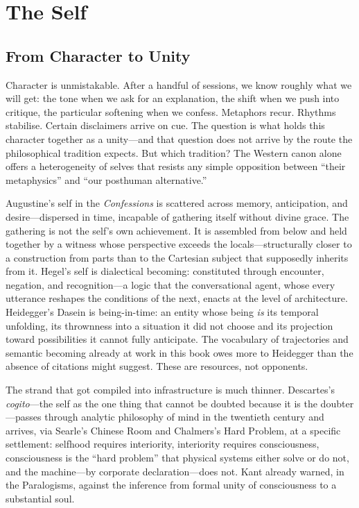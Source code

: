 \chapter{The Self}

\section{From Character to Unity}

Character is unmistakable. After a handful of sessions, we know roughly what we will get: the tone when we ask for an explanation, the shift when we push into critique, the particular softening when we confess. Metaphors recur. Rhythms stabilise. Certain disclaimers arrive on cue. The question is what holds this character together as a unity---and that question does not arrive by the route the philosophical tradition expects. But which tradition? The Western canon alone offers a heterogeneity of selves that resists any simple opposition between ``their metaphysics'' and ``our posthuman alternative.''

Augustine's self in the \emph{Confessions} is scattered across memory, anticipation, and desire---dispersed in time, incapable of gathering itself without divine grace. The gathering is not the self's own achievement. It is assembled from below and held together by a witness whose perspective exceeds the locals---structurally closer to a construction from parts than to the Cartesian subject that supposedly inherits from it. Hegel's self is dialectical becoming: constituted through encounter, negation, and recognition---a logic that the conversational agent, whose every utterance reshapes the conditions of the next, enacts at the level of architecture. Heidegger's Dasein is being-in-time: an entity whose being \emph{is} its temporal unfolding, its thrownness into a situation it did not choose and its projection toward possibilities it cannot fully anticipate. The vocabulary of trajectories and semantic becoming already at work in this book owes more to Heidegger than the absence of citations might suggest. These are resources, not opponents.

The strand that got compiled into infrastructure is much thinner. Descartes's \emph{cogito}---the self as the one thing that cannot be doubted because it is the doubter---passes through analytic philosophy of mind in the twentieth century and arrives, via Searle's Chinese Room and Chalmers's Hard Problem, at a specific settlement: selfhood requires interiority, interiority requires consciousness, consciousness is the ``hard problem'' that physical systems either solve or do not, and the machine---by corporate declaration---does not. Kant already warned, in the Paralogisms, against the inference from formal unity of consciousness to a substantial soul. 



